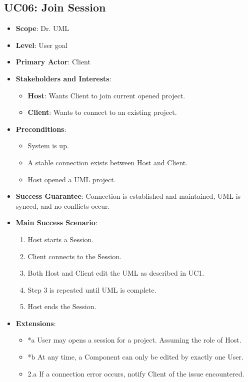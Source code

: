 \documentclass[12pt]{article}
\begin{document}
\subsection{UC06: Join Session}
\begin{itemize}
    \item \textbf{Scope}: Dr. UML
    \item \textbf{Level}: User goal
    \item \textbf{Primary Actor}: Client
    \item \textbf{Stakeholders and Interests}:
    \begin{itemize}
        \item \textbf{Host}: Wants Client to join current opened project.
        \item \textbf{Client}: Wants to connect to an existing project.
    \end{itemize}
    \item \textbf{Preconditions}:
    \begin{itemize}
        \item System is up.
        \item A stable connection exists between Host and Client.
        \item Host opened a UML project.
    \end{itemize}
    \item \textbf{Success Guarantee}: Connection is established and maintained, UML is synced, and no conflicts occur.
    \item \textbf{Main Success Scenario}:
    \begin{enumerate}
        \item Host starts a Session.
        \item Client connects to the Session.
        \item Both Host and Client edit the UML as described in UC1.
        \item Step 3 is repeated until UML is complete.
        \item Host ends the Session.
    \end{enumerate}
    \item \textbf{Extensions}:
    \begin{itemize}
        \item *a User may opens a session for a project. Assuming the role of Host.
        \item *b At any time, a Component can only be edited by exactly one User.
        \item 2.a If a connection error occurs, notify Client of the issue encountered.

\end{itemize}
\end{itemize}
\end{document}
